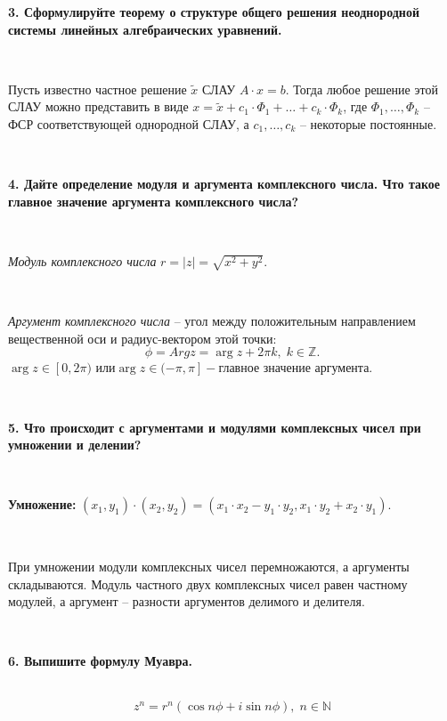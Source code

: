 \documentclass{article}
\begin{document}
    \textbf{3. Сформулируйте теорему о структуре общего решения неоднородной системы линейных алгебраических уравнений.}

    {
        $\;$
        \setlength{\parindent}{0.4cm}
        \hangindent=0.4cm

    Пусть известно частное решение $\tilde x$ СЛАУ $A\cdot x=b$. Тогда любое решение этой СЛАУ можно
    представить в виде $x=\tilde x+c_1\cdot\Phi_1+\ldots+c_k\cdot\Phi_k$, где $\Phi_1,\ldots, \Phi_k$ -- ФСР соответствующей однородной СЛАУ, а $c_1, \ldots, c_k$ -- некоторые постоянные.

        $\;$
        \setlength{\parindent}{0cm}
        \hangindent=0cm
    }


    \textbf{4. Дайте определение модуля и аргумента комплексного числа. Что такое главное значение аргумента комплексного числа?}

    {
        $\;$
        \setlength{\parindent}{0.4cm}
        \hangindent=0.4cm

    \textit{Модуль комплексного числа} $r=|z|=\sqrt{x^2+y^2}$.

        $\;$

        \textit{Аргумент комплексного числа} -- угол между положительным направлением вещественной оси и радиус-вектором этой точки:
        $$\phi=Arg z=\arg z+2\pi k, \; k\in \mathbb{Z}.$$
        $ \arg z\in[\left. 0, 2\pi\right.) \text{ или} \arg z\in (\left.-\pi, \pi \right. ] - \text{главное значение аргумента}.$

        $\;$
        \setlength{\parindent}{0cm}
        \hangindent=0cm
    }

    \textbf{5. Что происходит с аргументами и модулями комплексных чисел при умножении и делении?}

    {
        $\;$
        \setlength{\parindent}{0.4cm}
        \hangindent=0.4cm


    \textbf{Умножение:} $(x_1, y_1)\cdot(x_2, y_2)=(x_1\cdot x_2-y_1\cdot y_2, x_1\cdot y_2+x_2\cdot y_1)$.

        $\;$

        При умножении модули комплексных чисел перемножаются, а аргументы складываются. Модуль частного двух комплексных чисел равен частному модулей, а аргумент -- разности аргументов делимого и делителя.

        $\;$
        \setlength{\parindent}{0cm}
        \hangindent=0cm
    }


    \textbf{6. Выпишите формулу Муавра.}

    {
        $\;$
        \setlength{\parindent}{0.4cm}
        \hangindent=0.4cm
        $$z^n=r^n(\cos n\phi+i\sin n\phi),\; n\in\mathbb{N}$$

        $\;$
        \setlength{\parindent}{0cm}
        \hangindent=0cm
    }
\end{document}
